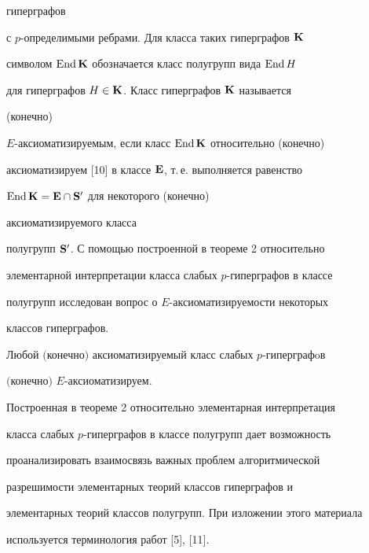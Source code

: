 гиперграфов 


с $p$-опре\-де\-ли\-мыми ребрами. Для класса таких гиперграфов $\bold K$ 


символом $\operatorname{End}\bold K$ обозначается класс полугрупп вида $\operatorname{End} H$ 


для гиперграфов $H\in\bold K$. Класс гиперграфов $\bold K$ называется 


(конечно) 


$E$-аксиома\-ти\-зи\-ру\-емым, если класс $\operatorname{End}\bold K$ относительно (конечно) 


аксиоматизируем [10] в классе $\bold E$, т.\,е. выполняется равенство 


$\operatorname{End}\bold K=\bold E\cap\bold S'$ для некоторого (конечно) 


аксиоматизируемого класса 


полугрупп $\bold S'$. С помощью построенной в теореме 2 относительно 


элементарной интерпретации класса слабых $p$-гиперграфов в классе 


полугрупп исследован вопрос о $E$-аксиоматизируемости некоторых 


классов гиперграфов. 


 


\begin{prop} 


Любой $($конечно$)$ аксиоматизируемый класс слабых $p$-гиперграфoв 


$($ко\-неч\-но$)$ $E$-аксиоматизируем. 


\end{prop} 


 


Построенная в теореме 2 относительно элементарная интерпретация 


класса слабых $p$-гиперграфов в классе полугрупп дает возможность 


проанализировать взаимосвязь важных проблем алгоритмической 


разрешимости элементарных теорий классов гиперграфов и 


элементарных теорий классов полугрупп. При изложении этого материала 


используется терминология работ [5], [11]. 


 


